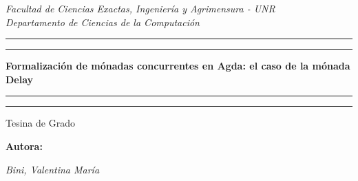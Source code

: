 \hypersetup{pageanchor=false}
\begin{titlepage}  %

	\centering %
	\scshape %
	
	\textit{\large Facultad de Ciencias Exactas, Ingeniería y Agrimensura - UNR\\Departamento de Ciencias de la Computación }
	
	\vspace{2\baselineskip}
	
	
	\rule{\textwidth}{1.6pt}\vspace*{-\baselineskip}\vspace*{2pt} %
	\rule{\textwidth}{0.4pt} %
	
	\vspace{\baselineskip} %
	
	{\LARGE \textbf{Formalización de mónadas concurrentes en Agda: el caso de la mónada
Delay}} %
	
	\vspace{\baselineskip} %
	
	\rule{\textwidth}{0.4pt}\vspace*{-\baselineskip}\vspace{3.2pt} %
	\rule{\textwidth}{1.6pt} %
	
	\vspace{2\baselineskip} %
	
	
	{\Large Tesina de Grado}
	\vspace*{3\baselineskip} %
	
	
	\Large{\textbf{Autora:}}
	
	
    {\itshape\LARGE Bini, Valentina María}
	
	

\end{titlepage}
